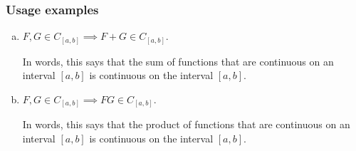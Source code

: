 \documentclass[12pt]{article}
\newenvironment{alphalist}{
  \begin{enumerate}[(a)]
    \addtolength{\itemsep}{-0.5\itemsep}}
  {\end{enumerate}}
\begin{document}
\subsubsection*{Usage examples}

\begin{alphalist}  


\item $F, G \in C_{[a,b]}  \implies F+G \in C_{[a,b]}$. 

In words, this says that the sum of  functions that are continuous on an
interval $[a,b]$ is continuous on the interval $[a,b]$.

\item $F, G \in C_{[a,b]} \implies F G \in C_{[a,b]}$. 

In words, this says that the product of  functions that are continuous on an
interval $[a,b]$ is  continuous on the interval $[a,b]$.

\end{alphalist}
\end{document}
